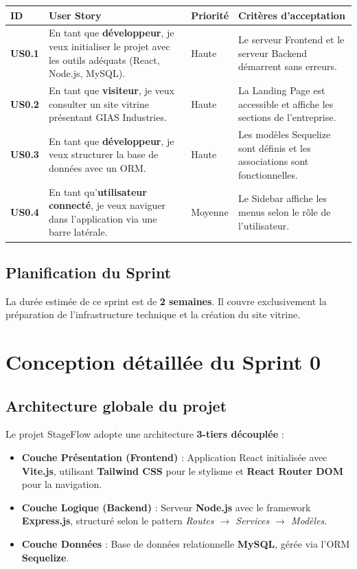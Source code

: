 \begin{center}
\begin{tabular}{|p{1cm}|p{6cm}|p{2cm}|p{5cm}|}
\hline
\textbf{ID} & \textbf{User Story} & \textbf{Priorité} & \textbf{Critères d'acceptation} \\ \hline
\textbf{US0.1} & En tant que \textbf{développeur}, je veux initialiser le projet avec les outils adéquats (React, Node.js, MySQL). & Haute & Le serveur Frontend et le serveur Backend démarrent sans erreurs. \\ \hline
\textbf{US0.2} & En tant que \textbf{visiteur}, je veux consulter un site vitrine présentant GIAS Industries. & Haute & La Landing Page est accessible et affiche les sections de l'entreprise. \\ \hline
\textbf{US0.3} & En tant que \textbf{développeur}, je veux structurer la base de données avec un ORM. & Haute & Les modèles Sequelize sont définis et les associations sont fonctionnelles. \\ \hline
\textbf{US0.4} & En tant qu'\textbf{utilisateur connecté}, je veux naviguer dans l'application via une barre latérale. & Moyenne & Le Sidebar affiche les menus selon le rôle de l'utilisateur. \\ \hline
\end{tabular}
\end{center}

\subsection{Planification du Sprint}
La durée estimée de ce sprint est de \textbf{2 semaines}. Il couvre exclusivement la préparation de l'infrastructure technique et la création du site vitrine.

\section{Conception détaillée du Sprint 0}

\subsection{Architecture globale du projet}
Le projet StageFlow adopte une architecture \textbf{3-tiers découplée} :
\begin{itemize}
    \item \textbf{Couche Présentation (Frontend)} : Application React initialisée avec \textbf{Vite.js}, utilisant \textbf{Tailwind CSS} pour le stylisme et \textbf{React Router DOM} pour la navigation.
    \item \textbf{Couche Logique (Backend)} : Serveur \textbf{Node.js} avec le framework \textbf{Express.js}, structuré selon le pattern \textit{Routes $\rightarrow$ Services $\rightarrow$ Modèles}.
    \item \textbf{Couche Données} : Base de données relationnelle \textbf{MySQL}, gérée via l'ORM \textbf{Sequelize}.
\end{itemize}

